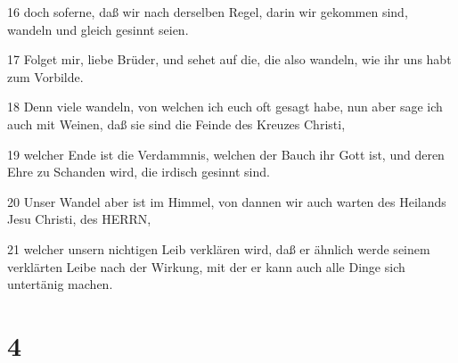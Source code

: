 \par 16 doch soferne, daß wir nach derselben Regel, darin wir gekommen sind, wandeln und gleich gesinnt seien.
\par 17 Folget mir, liebe Brüder, und sehet auf die, die also wandeln, wie ihr uns habt zum Vorbilde.
\par 18 Denn viele wandeln, von welchen ich euch oft gesagt habe, nun aber sage ich auch mit Weinen, daß sie sind die Feinde des Kreuzes Christi,
\par 19 welcher Ende ist die Verdammnis, welchen der Bauch ihr Gott ist, und deren Ehre zu Schanden wird, die irdisch gesinnt sind.
\par 20 Unser Wandel aber ist im Himmel, von dannen wir auch warten des Heilands Jesu Christi, des HERRN,
\par 21 welcher unsern nichtigen Leib verklären wird, daß er ähnlich werde seinem verklärten Leibe nach der Wirkung, mit der er kann auch alle Dinge sich untertänig machen.

\chapter{4}

